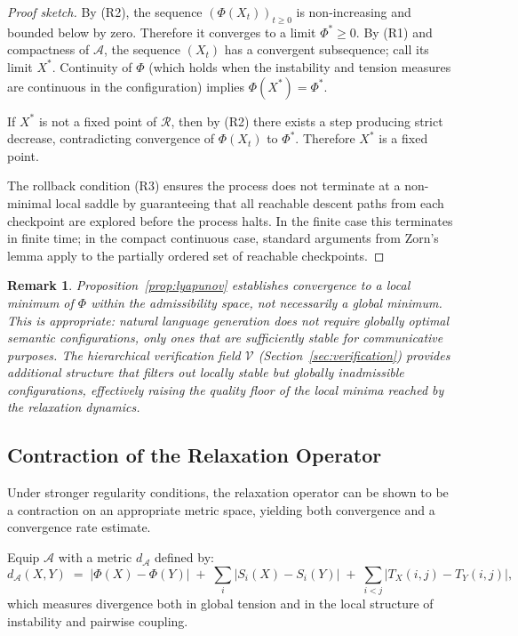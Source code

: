 \documentclass[11pt, a4paper]{article}
\theoremstyle{srn}
\theoremstyle{srnremark}
\newtheorem{remark}{Remark}[section]
\newcommand{\Aspace}{\mathcal{A}}           %
\newcommand{\Rop}{\mathcal{R}}           %
\newcommand{\Phiten}{\varPhi}            %
\begin{document}
\begin{proof}[Proof sketch]
By (R2), the sequence $(\Phiten(X_t))_{t \geq 0}$ is non-increasing
and bounded below by zero.
Therefore it converges to a limit $\Phiten^* \geq 0$.
By (R1) and compactness of $\Aspace$, the sequence $(X_t)$ has a
convergent subsequence; call its limit $X^*$.
Continuity of $\Phiten$ (which holds when the instability and tension
measures are continuous in the configuration) implies
$\Phiten(X^*) = \Phiten^*$.

If $X^*$ is not a fixed point of $\Rop$, then by (R2) there exists a
step producing strict decrease, contradicting convergence of
$\Phiten(X_t)$ to $\Phiten^*$.
Therefore $X^*$ is a fixed point.

The rollback condition (R3) ensures the process does not terminate at
a non-minimal local saddle by guaranteeing that all reachable descent
paths from each checkpoint are explored before the process halts.
In the finite case this terminates in finite time; in the compact
continuous case, standard arguments from Zorn's lemma apply to the
partially ordered set of reachable checkpoints.
\end{proof}

\begin{remark}
Proposition~\ref{prop:lyapunov} establishes convergence to a
\emph{local} minimum of $\Phiten$ within the admissibility space,
not necessarily a global minimum.
This is appropriate: natural language generation does not require
globally optimal semantic configurations, only ones that are
sufficiently stable for communicative purposes.
The hierarchical verification field $\mathcal{V}$ (Section~\ref{sec:verification})
provides additional structure that filters out locally stable but
globally inadmissible configurations, effectively raising the quality
floor of the local minima reached by the relaxation dynamics.
\end{remark}

\subsection{Contraction of the Relaxation Operator}

Under stronger regularity conditions, the relaxation operator can be
shown to be a contraction on an appropriate metric space, yielding
both convergence and a convergence rate estimate.

Equip $\Aspace$ with a metric $d_{\Aspace}$ defined by:
\[
  d_{\Aspace}(X, Y)
  \;=\;
  \left|\Phiten(X) - \Phiten(Y)\right|
  \;+\;
  \sum_{i} \left|S_i(X) - S_i(Y)\right|
  \;+\;
  \sum_{i<j} \left|T_X(i,j) - T_Y(i,j)\right|,
\]
which measures divergence both in global tension and in the local
structure of instability and pairwise coupling.
\end{document}
